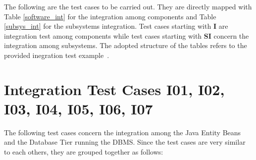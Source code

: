 The following are the test cases to be carried out. They are directly mapped with Table \ref{software_int} for the integration among components and Table \ref{subsys_int} for the subsystems integration. Test cases starting with \textbf{I} are integration test among components while test cases starting with \textbf{SI} concern the integration among subsystems. The adopted structure of the tables refers to the provided inegration test example~\cite{testplan_ex}.

\section{Integration Test Cases I01, I02, I03, I04, I05, I06, I07}

The following test cases concern the integration among the Java Entity Beans and the Database Tier running the DBMS. Since the test cases are very similar to each others, they are grouped together as follows:


